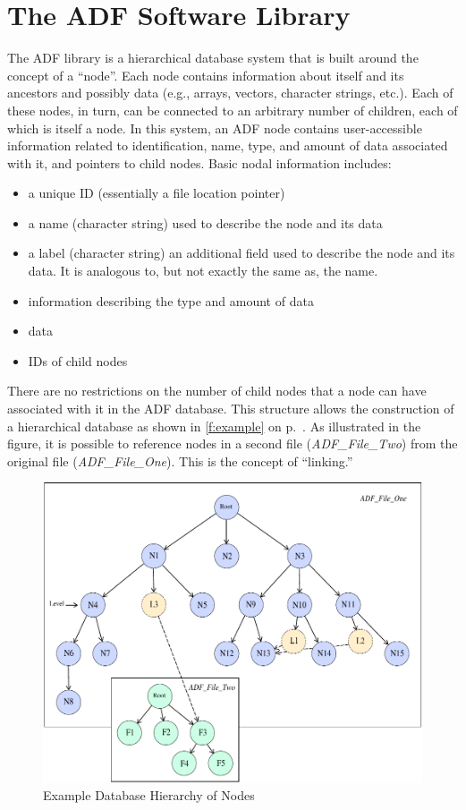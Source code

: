 \section{The ADF Software Library}
\label{s:library}
\thispagestyle{plain}

The ADF library is a hierarchical database system that is built around
the concept of a ``node''.
Each node contains information about itself and its ancestors and
possibly data (e.g., arrays, vectors, character strings, etc.).
Each of these nodes, in turn, can be connected to an arbitrary number of
children, each of which is itself a node.
In this system, an ADF node contains user-accessible information related
to identification, name, type, and amount of data associated with it,
and pointers to child nodes.
Basic nodal information includes:

\begin{itemize}
\item a unique ID (essentially a file location pointer)
\item a name (character string) used to describe the node and its data
\item a label (character string) an additional field used to describe the
      node and its data.
      It is analogous to, but not exactly the same as, the name.
\item information describing the type and amount of data
\item data
\item IDs of child nodes
\end{itemize}

There are no restrictions on the number of child nodes that a node can
have associated with it in the ADF database.
This structure allows the construction of a hierarchical database as
shown in \autoref{f:example} on p.~\pageref*{f:example}.
As illustrated in the figure, it is possible to reference nodes in a
second file (\textit{ADF\_File\_Two}) from the original file
(\textit{ADF\_File\_One}).
This is the concept of ``linking.''
\begin{figure}[!htb]
   \centering
   \includegraphics[width=6.0in]{adf_figure}
   \caption{Example Database Hierarchy of Nodes}
   \label{f:example}
\end{figure}

